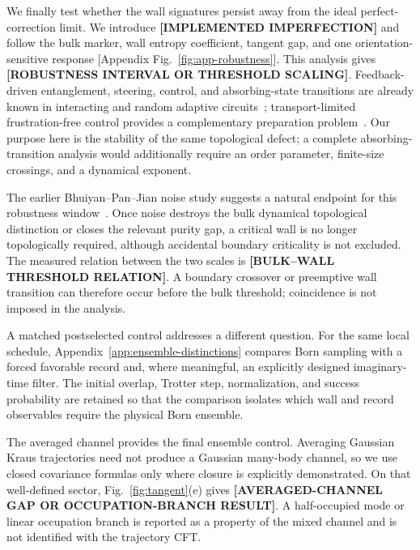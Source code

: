 \documentclass[aps,prx,twocolumn,superscriptaddress,longbibliography,nofootinbib,floatfix]{revtex4-2}
\newcommand{\ResultPlaceholder}[1]{\ignorespaces}
\newcommand{\ResultValue}[1]{\textcolor{BrickRed}{\textbf{[#1]}}}
\begin{document}
We finally test whether the wall signatures persist away from the ideal perfect-correction limit.  We introduce \ResultValue{IMPLEMENTED IMPERFECTION} and follow the bulk marker, wall entropy coefficient, tangent gap, and one orientation-sensitive response [Appendix Fig.~\ref{fig:app-robustness}].  This analysis gives \ResultValue{ROBUSTNESS INTERVAL OR THRESHOLD SCALING}.  Feedback-driven entanglement, steering, control, and absorbing-state transitions are already known in interacting and random adaptive circuits~\cite{IadecolaGaneshanPixley2023,RavindranathHanYang2023,SierantTurkeshi2023,ODeaMorningstarGopalakrishnan2024,PanGaneshanIadecola2024}; transport-limited frustration-free control provides a complementary preparation problem~\cite{Doerstel2026}.  Our purpose here is the stability of the same topological defect; a complete absorbing-transition analysis would additionally require an order parameter, finite-size crossings, and a dynamical exponent.  \ResultPlaceholder{Claim robustness only if this interval remains nonzero under size scaling; a single-size plateau is not evidence for a stable phase.}

The earlier Bhuiyan--Pan--Jian noise study suggests a natural endpoint for this robustness window~\cite{BhuiyanPanJian2026}.  Once noise destroys the bulk dynamical topological distinction or closes the relevant purity gap, a critical wall is no longer topologically required, although accidental boundary criticality is not excluded.  The measured relation between the two scales is \ResultValue{BULK--WALL THRESHOLD RELATION}.  A boundary crossover or preemptive wall transition can therefore occur before the bulk threshold; coincidence is not imposed in the analysis.  \ResultPlaceholder{State coincidence of wall and bulk thresholds only if independent finite-size crossings and uncertainty estimates resolve a common critical point; otherwise report separate crossover or transition scales.}

A matched postselected control addresses a different question.  For the same local schedule, Appendix~\ref{app:ensemble-distinctions} compares Born sampling with a forced favorable record and, where meaningful, an explicitly designed imaginary-time filter.  The initial overlap, Trotter step, normalization, and success probability are retained so that the comparison isolates which wall and record observables require the physical Born ensemble.

The averaged channel provides the final ensemble control.  Averaging Gaussian Kraus trajectories need not produce a Gaussian many-body channel, so we use closed covariance formulas only where closure is explicitly demonstrated.  On that well-defined sector, Fig.~\ref{fig:tangent}(e) gives \ResultValue{AVERAGED-CHANNEL GAP OR OCCUPATION-BRANCH RESULT}.  A half-occupied mode or linear occupation branch is reported as a property of the mixed channel and is not identified with the trajectory CFT.  \ResultPlaceholder{Any statement that criticality is ``hidden in trajectories'' must be supported by a matched channel calculation showing the absence of the same finite-size singularity in a well-defined channel observable.}
\end{document}
